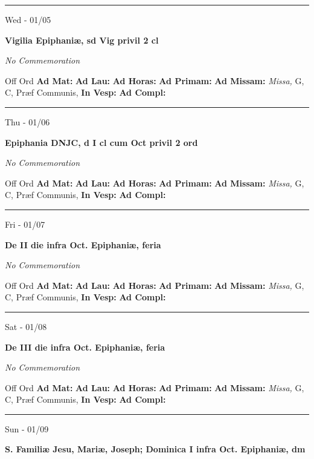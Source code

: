 \documentclass[letterpaper, 10pt]{article}
\begin{document}
\hrule
\begin{center}
Wed - 01/05
\end{center}\textbf{ \large Vigilia Epiphaniæ, \textnormal{\normalsize sd Vig privil 2 cl}}

\textit{No Commemoration}\begin{justify}
Off Ord
\textbf{Ad Mat: }
\textbf{Ad Lau: }
\textbf{Ad Horas: }
\textbf{Ad Primam: }
\textbf{Ad Missam:} \textit{Missa, } G, C, Præf Communis, 
\textbf{In Vesp: }
\textbf{Ad Compl: }\end{justify}



\hrule
\begin{center}
Thu - 01/06
\end{center}\textbf{ \large Epiphania DNJC, \textnormal{\normalsize d I cl cum Oct privil 2 ord}}

\textit{No Commemoration}\begin{justify}
Off Ord
\textbf{Ad Mat: }
\textbf{Ad Lau: }
\textbf{Ad Horas: }
\textbf{Ad Primam: }
\textbf{Ad Missam:} \textit{Missa, } G, C, Præf Communis, 
\textbf{In Vesp: }
\textbf{Ad Compl: }\end{justify}



\hrule
\begin{center}
Fri - 01/07
\end{center}\textbf{ \large De II die infra Oct. Epiphaniæ, \textnormal{\normalsize feria}}

\textit{No Commemoration}\begin{justify}
Off Ord
\textbf{Ad Mat: }
\textbf{Ad Lau: }
\textbf{Ad Horas: }
\textbf{Ad Primam: }
\textbf{Ad Missam:} \textit{Missa, } G, C, Præf Communis, 
\textbf{In Vesp: }
\textbf{Ad Compl: }\end{justify}



\hrule
\begin{center}
Sat - 01/08
\end{center}\textbf{ \large De III die infra Oct. Epiphaniæ, \textnormal{\normalsize feria}}

\textit{No Commemoration}\begin{justify}
Off Ord
\textbf{Ad Mat: }
\textbf{Ad Lau: }
\textbf{Ad Horas: }
\textbf{Ad Primam: }
\textbf{Ad Missam:} \textit{Missa, } G, C, Præf Communis, 
\textbf{In Vesp: }
\textbf{Ad Compl: }\end{justify}



\hrule
\begin{center}
Sun - 01/09
\end{center}\textbf{ \large S. Familiæ Jesu, Mariæ, Joseph; Dominica I infra Oct. Epiphaniæ, \textnormal{\normalsize dm}}
\end{document}
